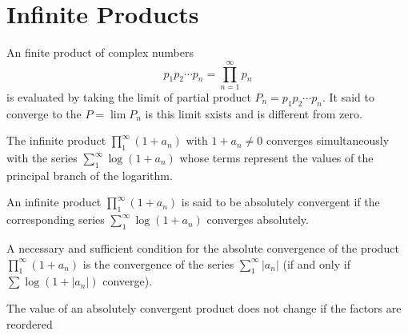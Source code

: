 \documentclass[12pt, oneside]{book}
\begin{document}
\section{Infinite Products}
\begin{definition}
    An finite product of complex numbers
    $$p_1p_2\cdots p_n=\prod_{n=1}^\infty p_n$$
    is evaluated by taking the limit of partial product $P_n=p_1p_2\cdots p_n$. It said to converge to the $P=\lim P_n$ is this limit sxists and is different from zero.
\end{definition}
\begin{theorem}
    The infinite product $\prod\limits_1^{\infty}\left(1+a_n\right)$ with $1+a_n \neq 0$ converges simultaneously with the series $\sum\limits_1^{\infty} \log \left(1+a_n\right)$ whose terms represent the values of the principal branch of the logarithm.
\end{theorem}
\begin{definition}
    An infinite product $\prod\limits_1^{\infty}\left(1+a_n\right)$ is said to be absolutely convergent if the corresponding series $\sum\limits_1^{\infty}\log\left(1+a_n\right)$ converges absolutely.
\end{definition}
\begin{theorem}
    A necessary and sufficient condition for the absolute convergence of the product $\prod\limits_1^{\infty}\left(1+a_n\right)$ is the convergence of the series $\sum\limits_1^{\infty}\left|a_n\right|$ (if and only if $\sum \log(1+\left|a_n\right|)$ converge).
\end{theorem}
\begin{theorem}
    The value of an absolutely convergent product does not change if the factors are reordered
\end{theorem}
\end{document}

